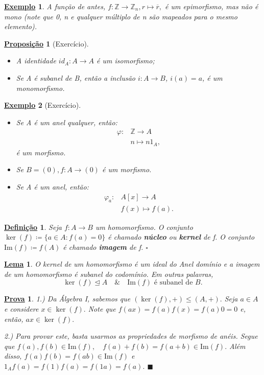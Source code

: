 \documentclass{article}
\newtheorem*{def*}{\underline{Defini\c c\~ao}}
\newtheorem*{lemma*}{\underline{Lema}}
\newtheorem*{prop*}{\underline{Proposi\c c\~ao}}
\newtheorem{example}{\underline{Exemplo}}
\newtheorem*{proof*}{\underline{Prova}}
\renewcommand\qedsymbol{$\blacksquare$}
\begin{document}
\begin{example}
  A função de antes, \(f:\mathbb{Z}\rightarrow \mathbb{Z}_{n}, r \mapsto \overline{r},\) é um epimorfismo, mas não é mono (note que 0, n e qualquer múltiplo de n
são mapeados para o mesmo elemento).
\end{example}
\begin{prop*}[Exercício]
  \begin{itemize}
    \item[1)] A identidade \(id_{A}:A\rightarrow A\) é um isomorfismo;
    \item[2)] Se A é subanel de B, então a inclusão \(i:A\rightarrow B\), \(i(a) = a\), é
      um monomorfismo.
  \end{itemize}
\end{prop*}
\begin{example}[Exercício]
  \begin{itemize}
    \item[1)] Se A é um anel qualquer, então:
      \begin{align*}
        \varphi:&\mathbb{Z}\rightarrow A\\
                &n\mapsto n1_{A},
      \end{align*}
      é um morfismo.
    \item[2)] Se \(B=(0), f:A\rightarrow (0)\) é um morfismo.
    \item[3)] Se A é um anel, então:
      \begin{align*}
        \varphi_{a}:&A[x]\rightarrow A\\
          &f(x)\mapsto f(a).
      \end{align*}
  \end{itemize}
\end{example}
\begin{def*}
  Seja \(f:A\rightarrow B\) um homomorfismo. O conjunto \(\ker{(f)}\coloneqq \{a\in A: f(a) = 0\}\)
  é chamado \textbf{núcleo} ou \textbf{kernel} de f. O conjunto \(\mathrm{Im}(f)\coloneqq f(A)\) é chamado 
  \textbf{imagem} de f. \(\square\)
\end{def*}
\begin{lemma*}
  O kernel de um homomorfismo é um ideal do Anel domínio e a imagem de um homomorfismo é subanel do codomínio. Em outras palavras,
  \[
    \ker{(f)}\trianglelefteq{A}\quad\&\quad \mathrm{Im}(f)\text{ é subanel de }B.
  \]
\end{lemma*}
\begin{proof*}
  1.) Da Álgebra I, sabemos que \((\ker{(f)}, +)\leq (A, +).\) Seja \(a\in A\) e 
  considere \(x\in\ker{(f)}.\) Note que \(f(ax) = f(a)f(x) = f(a)0 = 0\) e, então, \(ax\in\ker{(f)}.\)

  2.) Para provar este, basta usarmos as propriedades de morfismo de anéis. Segue que
  \(f(a), f(b)\in \mathrm{Im}(f),\quad f(a) + f(b) = f(a+b)\in \mathrm{Im}(f).\) Além disso,
  \(f(a)f(b) = f(ab)\in \mathrm{Im}(f)\) e \(1_{A}f(a) = f(1)f(a) = f(1a) = f(a).\) \qedsymbol
\end{proof*}
\end{document}

